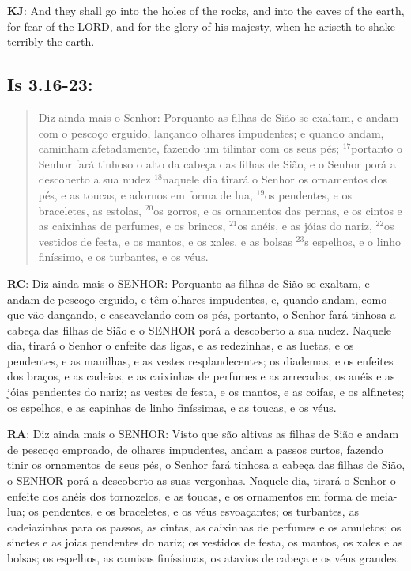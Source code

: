 \textbf{KJ}: And they shall go into the holes of the rocks, and into the caves of the earth, for fear of the LORD, and for the glory of his majesty, when he ariseth to shake terribly the earth.

\subsection*{Is 3.16-23:} 
 \begin{quote}
  \small
 Diz ainda mais o Senhor: Porquanto as filhas de Sião se exaltam, e andam com o pescoço erguido, lançando olhares impudentes; e quando andam, caminham afetadamente, fazendo um tilintar com os seus pés; $^{\mathrm{17}}$portanto o Senhor fará tinhoso o alto da cabeça das filhas de Sião, e o Senhor porá a descoberto a sua nudez\uwave{,} $^{\mathrm{18}}$naquele dia tirará o Senhor os ornamentos dos pés, e as toucas, e adornos em forma de lua, $^{\mathrm{19}}$os pendentes, e os braceletes, as estolas, $^{\mathrm{20}}$os gorros, e os ornamentos das pernas, e os cintos e as caixinhas de perfumes, e os brincos, $^{\mathrm{21}}$os anéis, e as jóias do nariz, $^{\mathrm{22}}$os vestidos de festa, e os mantos, e os xales, e as bolsas $^{\mathrm{23}}$s espelhos, e o linho finíssimo, e os turbantes, e os véus.
\end{quote}

\textbf{RC}: Diz ainda mais o SENHOR: Porquanto as filhas de Sião se exaltam, e andam de pescoço erguido, e têm olhares impudentes, e, quando andam, como que vão dançando, e cascavelando com os pés, portanto, o Senhor fará tinhosa a cabeça das filhas de Sião e o SENHOR porá a descoberto a sua nudez. Naquele dia, tirará o Senhor o enfeite das ligas, e as redezinhas, e as luetas, e os pendentes, e as manilhas, e as vestes resplandecentes; os diademas, e os enfeites dos braços, e as cadeias, e as caixinhas de perfumes e as arrecadas; os anéis e as jóias pendentes do nariz; as vestes de festa, e os mantos, e as coifas, e os alfinetes; os espelhos, e as capinhas de linho finíssimas, e as toucas, e os véus.

\textbf{RA}: Diz ainda mais o SENHOR: Visto que são altivas as filhas de Sião e andam de pescoço emproado, de olhares impudentes, andam a passos curtos, fazendo tinir os ornamentos de seus pés, o Senhor fará tinhosa a cabeça das filhas de Sião, o SENHOR porá a descoberto as suas vergonhas. Naquele dia, tirará o Senhor o enfeite dos anéis dos tornozelos, e as toucas, e os ornamentos em forma de meia-lua; os pendentes, e os braceletes, e os véus esvoaçantes; os turbantes, as cadeiazinhas para os passos, as cintas, as caixinhas de perfumes e os amuletos; os sinetes e as joias pendentes do nariz; os vestidos de festa, os mantos, os xales e as bolsas; os espelhos, as camisas finíssimas, os atavios de cabeça e os véus grandes.

